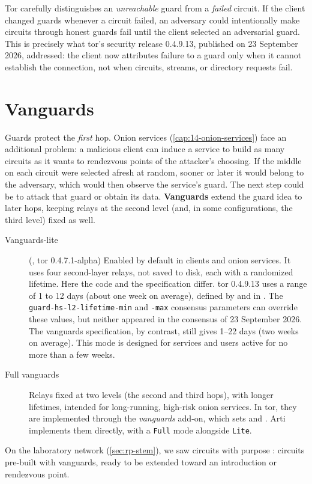 \begin{attenzione}
Tor carefully distinguishes an \emph{unreachable} guard from a \emph{failed} circuit. If the client changed guards whenever a circuit failed, an adversary could intentionally make circuits through honest guards fail until the client selected an adversarial guard. This is precisely what tor's security release 0.4.9.13, published on 23 September 2026, addressed: the client now attributes failure to a guard only when it cannot establish the connection, not when circuits, streams, or directory requests fail.
\end{attenzione}

\section{Vanguards}\label{sec:vanguards}

Guards protect the \emph{first} hop. Onion services (\cref{cap:14-onion-services}) face an additional problem: a malicious client can induce a service to build as many circuits as it wants to rendezvous points of the attacker's choosing. If the middle on each circuit were selected afresh at random, sooner or later it would belong to the adversary, which would then observe the service's guard. The next step could be to attack that guard or obtain its data. \textbf{Vanguards} extend the guard idea to later hops, keeping relays at the second level (and, in some configurations, the third level) fixed as well.

\begin{description}
  \item[Vanguards-lite] (, tor 0.4.7.1-alpha) Enabled by default in clients and onion services. It uses four second-layer relays, not saved to disk, each with a randomized lifetime. Here the code and the specification differ. tor 0.4.9.13 uses a range of 1 to 12 days (about one week on average), defined by  and  in . The \texttt{guard-hs-l2-lifetime-min} and \texttt{-max} consensus parameters can override these values, but neither appeared in the consensus of 23 September 2026. The vanguards specification, by contrast, still gives 1--22 days (two weeks on average). This mode is designed for services and users active for no more than a few weeks.
  \item[Full vanguards] Relays fixed at two levels (the second and third hops), with longer lifetimes, intended for long-running, high-risk onion services. In tor, they are implemented through the \emph{vanguards} add-on, which sets  and . Arti implements them directly, with a \texttt{Full} mode alongside \texttt{Lite}.
\end{description}
On the laboratory network (\cref{sec:rp-stem}), we saw circuits with purpose : circuits pre-built with vanguards, ready to be extended toward an introduction or rendezvous point.

